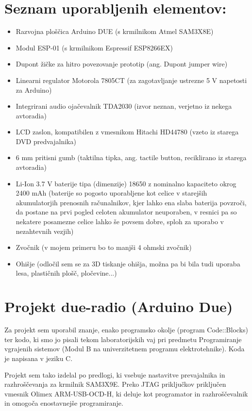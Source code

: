 \documentclass[12pt,a4paper,twoside,openright,slovene]{book}
\begin{document}
\section{Seznam uporabljenih elementov:} \label{uporabljeni_elementi}
\begin{itemize}
\item Razvojna ploščica Arduino DUE (s krmilnikom Atmel SAM3X8E)
\item Modul ESP-01 (s krmilnikom Espressif ESP8266EX)
\item Dupont žičke za hitro povezovanje prototip (ang. Dupont jumper wire)
\item Linearni regulator Motorola 7805CT (za zagotavljanje ustrezne 5 V napetosti za Arduino)
\item Integrirani audio ojačevalnik TDA2030 (izvor neznan, verjetno iz nekega avtoradia)
\item LCD zaslon, kompatibilen z vmesnikom Hitachi HD44780 (vzeto iz starega DVD predvajalnika)
\item 6 mm pritisni gumb (taktilna tipka, ang. tactile button, reciklirano iz starega avtoradia)
\item Li-Ion 3.7 V baterije tipa (dimenzije) 18650 z nominalno kapaciteto okrog 2400 mAh (baterije so pogosto uporabljene kot celice v  starejših akumulatorjih prenosnih računalnikov, kjer lahko ena slaba baterija povzroči, da postane na prvi pogled celoten akumulator  neuporaben, v resnici pa so nekatere posamezne celice lahko še povsem dobre, sploh za uporabo v nezahtevnih vezjih)
\item Zvočnik (v mojem primeru bo to manjši 4 ohmski zvočnik)
\item Ohišje (odločil sem se za 3D tiskanje ohišja, možna pa bi bila tudi uporaba lesa, plastičnih plošč, pločevine...)
\end{itemize}

\section{Projekt due-radio (Arduino Due)} \label{due_radio_projekt}
Za projekt sem uporabil znanje, enako programsko okolje (program Code::Blocks) ter kodo, ki smo jo pisali tekom laboratorijskih vaj pri  predmetu Programiranje vgrajenih sistemov (Modul B na univerzitetnem programu elektrotehnike). Koda je napisana v jeziku C.

Projekt sem tako izdelal po predlogi, ki vsebuje nastavitve prevajalnika in razhroščevanja za krmilnik SAM3X9E. Preko JTAG priključkov priključen vmesnik Olimex ARM-USB-OCD-H, ki deluje kot programator in razhroščevalnik in omogoča enostavnejše programiranje.
\end{document}
